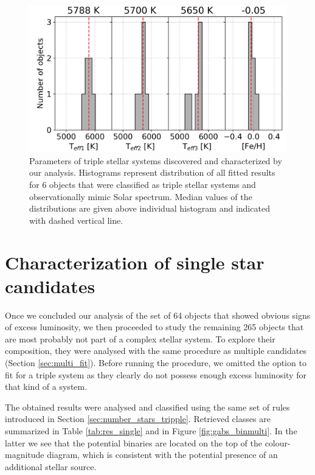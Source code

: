 \begin{figure}
	\centering
	\includegraphics[width=\columnwidth]{triple_stars_params_multi.png}
	\caption{Parameters of triple stellar systems discovered and characterized by our analysis. Histograms represent distribution of all fitted results for 6 objects that were classified as triple stellar systems and observationally mimic Solar spectrum. Median values of the distributions are given above individual histogram and indicated with dashed vertical line.}
	\label{fig:triple_params}
\end{figure}

\section{Characterization of single star candidates}
\label{sec:single_fit}
Once we concluded our analysis of the set of 64 objects that showed obvious signs of excess luminosity, we then proceeded to study the remaining 265 objects that are most probably not part of a complex stellar system. To explore their composition, they were analysed with the same procedure as multiple candidates (Section \ref{sec:multi_fit}). Before running the procedure, we omitted the option to fit for a triple system as they clearly do not possess enough excess luminosity for that kind of a system.

The obtained results were analysed and classified using the same set of rules introduced in Section \ref{sec:number_stars_tripple}. Retrieved classes are summarized in Table \ref{tab:res_single} and in Figure \ref{fig:gabs_binmulti}. In the latter we see that the potential binaries are located on the top of the colour-magnitude diagram, which is consistent with the potential presence of an additional stellar source.

